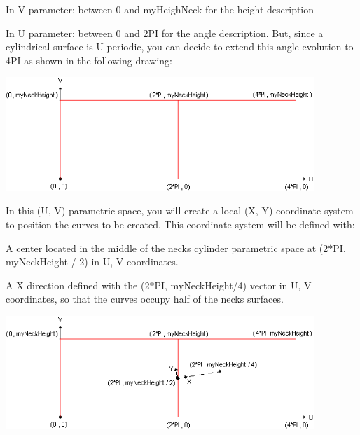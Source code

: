 \begin{DoxyItemize}
\item In V parameter\+: between 0 and my\+Heigh\+Neck for the height description
\item In U parameter\+: between 0 and 2\+PI for the angle description. But, since a cylindrical surface is U periodic, you can decide to extend this angle evolution to 4\+PI as shown in the following drawing\+:
\end{DoxyItemize}


\begin{DoxyImageNoCaption}
\begin{center}
   \mbox{\includegraphics[width=440]{tutorial_image014.png}}
\end{center}
\end{DoxyImageNoCaption}


In this (U, V) parametric space, you will create a local (X, Y) coordinate system to position the curves to be created. This coordinate system will be defined with\+:


\begin{DoxyItemize}
\item A center located in the middle of the neck\textquotesingle{}s cylinder parametric space at (2$\ast$\+PI, my\+Neck\+Height / 2) in U, V coordinates.
\item A X direction defined with the (2$\ast$\+PI, my\+Neck\+Height/4) vector in U, V coordinates, so that the curves occupy half of the neck\textquotesingle{}s surfaces.
\end{DoxyItemize}


\begin{DoxyImageNoCaption}
\begin{center}
   \mbox{\includegraphics[width=440]{tutorial_image015.png}}
\end{center}
\end{DoxyImageNoCaption}


